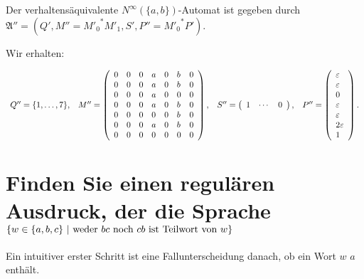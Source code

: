 \documentclass[]{scrartcl}
\newcommand{\matr}[2]{\left(\begin{array}{#1}#2\end{array}\right)}
\newcommand{\e}{\varepsilon}
\begin{document}
Der verhaltensäquivalente $N^\infty(\{a,b\})$-Automat ist gegeben durch\\
$\mathfrak{A}''=(Q',M'' = {M'_0}^*M'_1, S', P'' = {M'_0}^*P')$.
%

Wir erhalten:

$$
\begin{array}{c c c c}
	Q'' = \{1,\dots,7\}, &
	M'' = \matr{l l l l l l l}{
		0 & 0 & 0 & a & 0 & b & 0\\
		0 & 0 & 0 & a & 0 & b & 0\\
		0 & 0 & 0 & a & 0 & 0 & 0\\
		0 & 0 & 0 & a & 0 & b & 0\\
		0 & 0 & 0 & 0 & 0 & b & 0\\
		0 & 0 & 0 & a & 0 & b & 0\\
		0 & 0 & 0 & 0 & 0 & 0 & 0\\
	}, &
	S'' = \matr{l l l}{1 & \cdots & 0}, &
	P'' = \matr{l}{\e\\\e\\0\\\e\\\e\\2 \e\\1}.
\end{array}
$$

\section{Finden Sie einen regulären Ausdruck, der die Sprache $\{w \in \{a,b,c\}\ |\ \textnormal{weder } bc \textnormal{ noch } cb \textnormal{ ist Teilwort von } w \}$}

Ein intuitiver erster Schritt ist eine Fallunterscheidung danach, ob ein Wort $w$ $a$ enthält.
\end{document}
